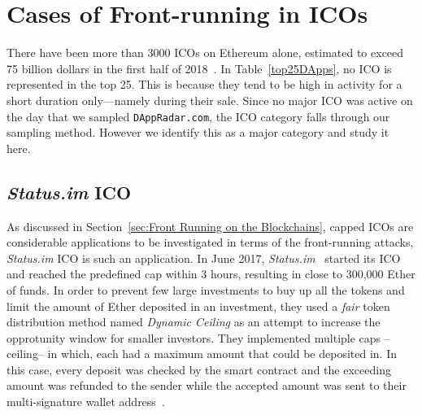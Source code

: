 \section{Cases of Front-running in ICOs}  \label{sec:ICOsfrontrunning}

There have been more than 3000 ICOs on Ethereum alone, estimated to exceed 75 billion dollars in the first half of 2018~\cite{zetzsche2018ico}. In Table~\ref{top25DApps}, no ICO is represented in the top 25. This is because they tend to be high in activity for a short duration only---namely during their sale. Since no major ICO was active on the day that we sampled \texttt{DAppRadar.com}, the ICO category falls through our sampling method. However we identify this as a major category and study it here. 






\subsection{\textit{Status.im} ICO}
As discussed in Section~\ref{sec:Front Running on the Blockchains}, capped ICOs are considerable applications to be investigated in terms of the front-running attacks, \textit{Status.im} ICO is such an application. In June 2017, \textit{Status.im}~\cite{statuswhitepaper} started its ICO and reached the predefined cap within 3 hours, resulting in close to 300,000 Ether of funds. In order to prevent few large investments to buy up all the tokens and limit the amount of Ether deposited in an investment, they used a \textit{fair} token distribution method named \textit{Dynamic Ceiling} as an attempt to increase the opprotunity window for smaller investors. They implemented multiple caps --ceiling-- in which, each had a maximum amount that could be deposited in. In this case, every deposit was checked by the smart contract and the exceeding amount was refunded to the sender while the accepted amount was sent to their multi-signature wallet address~\cite{statusicoanalysis}. 


